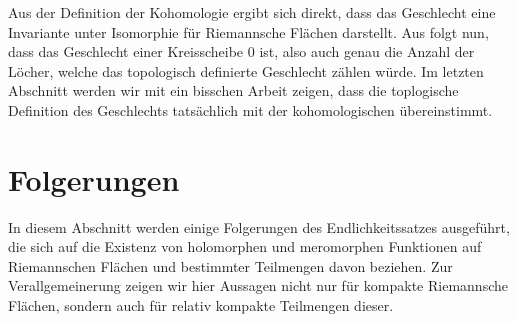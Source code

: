 \documentclass[11pt,a4paper,toc=bibliography]{scrartcl}
\theoremstyle{def}
\theoremstyle{thm}
\theoremstyle{remark}
\begin{document}
Aus der Definition der Kohomologie ergibt sich direkt, dass das Geschlecht eine Invariante unter Isomorphie für Riemannsche Flächen darstellt.  Aus  folgt nun, dass das Geschlecht einer Kreisscheibe 0 ist, also auch genau die Anzahl der Löcher, welche das topologisch definierte Geschlecht zählen würde. 
Im letzten Abschnitt werden wir mit ein bisschen Arbeit zeigen, dass die toplogische Definition des Geschlechts tatsächlich mit der kohomologischen übereinstimmt. 
\section{Folgerungen}
In diesem Abschnitt werden einige Folgerungen des Endlichkeitssatzes ausgeführt, die sich auf die Existenz von holomorphen und meromorphen Funktionen auf Riemannschen Flächen und bestimmter Teilmengen davon beziehen.
Zur Verallgemeinerung zeigen wir hier Aussagen nicht nur für kompakte Riemannsche Flächen, sondern auch für relativ kompakte Teilmengen dieser.
\end{document}
